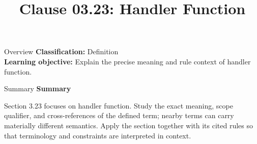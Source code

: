 \documentclass[10pt,letterpaper]{article}
\title{Clause 03.23: Handler Function}
\author{}
\date{}
\begin{document}
\maketitle
\begin{CornellOverviewBox}{Overview}
\textbf{Classification:} Definition\\[2pt]
\textbf{Learning objective:} Explain the precise meaning and rule context of handler function.
\end{CornellOverviewBox}\begin{CornellSummaryBox}{Summary}
{\sffamily\bfseries\color{Accent} Summary}\par\vspace{3pt}Section 3.23 focuses on handler function. Study the exact meaning, scope qualifier, and cross-references of the defined term; nearby terms can carry materially different semantics. Apply the section together with its cited rules so that terminology and constraints are interpreted in context.
\end{CornellSummaryBox}
\end{document}
